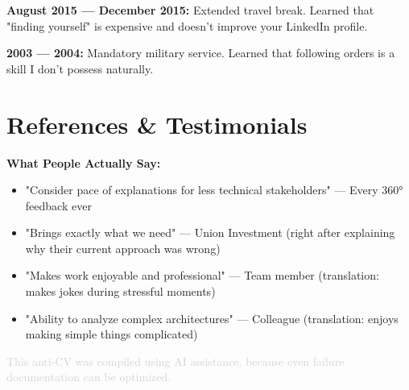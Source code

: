 \documentclass[10pt,a4paper]{article}
\begin{document}
\textbf{August 2015 — December 2015:} Extended travel break. Learned that "finding yourself" is expensive and doesn't improve your LinkedIn profile.

\textbf{2003 — 2004:} Mandatory military service. Learned that following orders is a skill I don't possess naturally.

\section{References \& Testimonials}

\textbf{What People Actually Say:}
\begin{itemize}[leftmargin=1em, itemsep=0.2em]
\item "Consider pace of explanations for less technical stakeholders" — Every 360° feedback ever
\item "Brings exactly what we need" — Union Investment (right after explaining why their current approach was wrong)
\item "Makes work enjoyable and professional" — Team member (translation: makes jokes during stressful moments)
\item "Ability to analyze complex architectures" — Colleague (translation: enjoys making simple things complicated)
\end{itemize}

\vspace{1em}
\begin{center}
\textcolor{lightgray}{\footnotesize This anti-CV was compiled using AI assistance, because even failure documentation can be optimized.}
\end{center}
\end{document}
